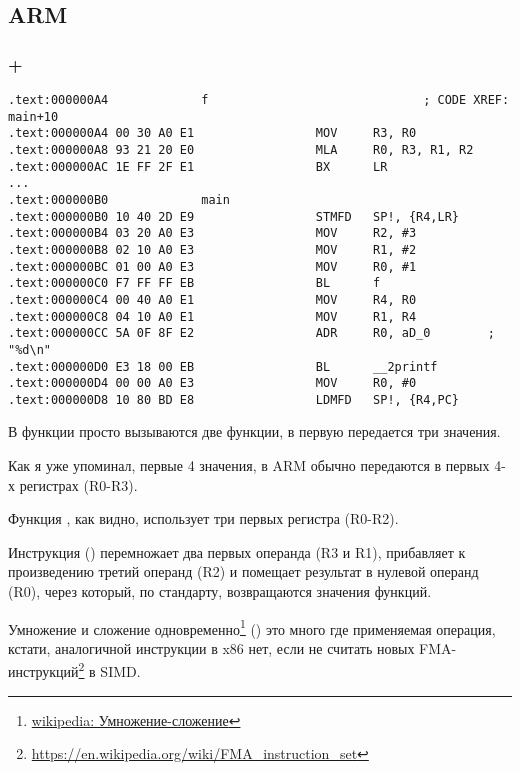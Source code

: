 ﻿\subsection{ARM}

\subsubsection{\NonOptimizingKeil + \ARMMode}

\begin{lstlisting}
.text:000000A4             f                              ; CODE XREF: main+10
.text:000000A4 00 30 A0 E1                 MOV     R3, R0
.text:000000A8 93 21 20 E0                 MLA     R0, R3, R1, R2
.text:000000AC 1E FF 2F E1                 BX      LR
...
.text:000000B0             main
.text:000000B0 10 40 2D E9                 STMFD   SP!, {R4,LR}
.text:000000B4 03 20 A0 E3                 MOV     R2, #3
.text:000000B8 02 10 A0 E3                 MOV     R1, #2
.text:000000BC 01 00 A0 E3                 MOV     R0, #1
.text:000000C0 F7 FF FF EB                 BL      f
.text:000000C4 00 40 A0 E1                 MOV     R4, R0
.text:000000C8 04 10 A0 E1                 MOV     R1, R4
.text:000000CC 5A 0F 8F E2                 ADR     R0, aD_0        ; "%d\n"
.text:000000D0 E3 18 00 EB                 BL      __2printf
.text:000000D4 00 00 A0 E3                 MOV     R0, #0
.text:000000D8 10 80 BD E8                 LDMFD   SP!, {R4,PC}
\end{lstlisting}

В функции \main просто вызываются две функции, в первую передается три значения.

Как я уже упоминал, первые 4 значения, в ARM обычно передаются в первых 4-х регистрах (R0-R3).

Функция , как видно, использует три первых регистра (R0-R2).

Инструкция  () перемножает два первых операнда (R3 и R1), прибавляет к произведению
третий операнд (R2) и помещает результат в нулевой операнд (R0), через который, по стандарту, возвращаются
значения функций.

Умножение и сложение одновременно\footnote{\href{https://ru.wikipedia.org/wiki/\%D0\%A3\%D0\%BC\%D0\%BD\%D0\%BE\%D0\%B6\%D0\%B5\%D0\%BD\%D0\%B8\%D0\%B5-\%D1\%81\%D0\%BB\%D0\%BE\%D0\%B6\%D0\%B5\%D0\%BD\%D0\%B8\%D0\%B5}{wikipedia: Умножение-сложение}} () это много где применяемая операция, кстати, аналогичной
инструкции в x86 нет, если не считать новых 
FMA-инструкций\footnote{\url{https://en.wikipedia.org/wiki/FMA_instruction_set}} в SIMD.

